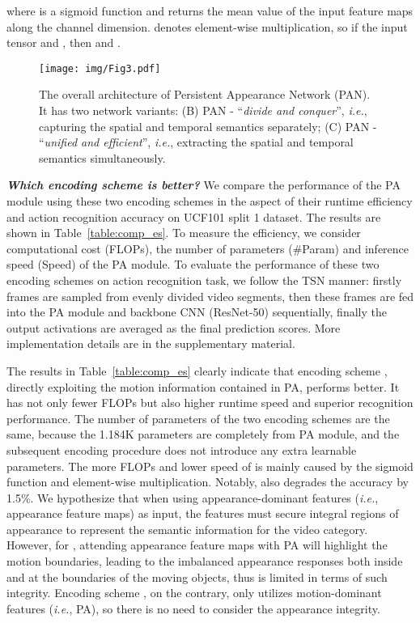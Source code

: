 \documentclass[journal]{IEEEtran}
\begin{document}
\noindent where  is a sigmoid function and  returns the mean value of the input feature maps along the channel dimension.  denotes element-wise multiplication, so if the input tensor  and , then  and .





\begin{figure*}[!htbp]
\begin{center}
\texttt{[image: img/Fig3.pdf]}
\end{center}
   \caption{The overall architecture of Persistent Appearance Network (PAN). It has two network variants: (B) PAN - ``\emph{divide and conquer}'', \emph{i.e.}, capturing the spatial and temporal semantics separately; (C) PAN - ``\emph{unified and efficient}'', \emph{i.e.}, extracting the spatial and temporal semantics simultaneously.}
\label{fig:PAN}
\end{figure*}

\textbf{\emph{Which encoding scheme is better? }} We compare the performance of the PA module using these two encoding schemes in the aspect of their runtime efficiency and action recognition accuracy on UCF101 split 1 dataset. The results are shown in Table~\ref{table:comp_es}. To measure the efficiency, we consider computational cost (FLOPs), the number of parameters (\#Param) and inference speed (Speed) of the PA module. To evaluate the performance of these two encoding schemes on action recognition task, we follow the TSN manner: firstly frames are sampled from evenly divided video segments, then these frames are fed into the PA module and backbone CNN (ResNet-50) sequentially, finally the output activations are averaged as the final prediction scores. More implementation details are in the supplementary material.

The results in Table~\ref{table:comp_es} clearly indicate that encoding scheme , directly exploiting the motion information contained in PA, performs better. It has not only fewer FLOPs but also higher runtime speed and superior recognition performance. The number of parameters of the two encoding schemes are the same, because the 1.184K parameters are completely from PA module, and the subsequent encoding procedure does not introduce any extra learnable parameters. The more FLOPs and lower speed of  is mainly caused by the sigmoid function and element-wise multiplication. Notably,  also degrades the accuracy by 1.5\%. We hypothesize that when using appearance-dominant features (\emph{i.e.}, appearance feature maps) as input, the features must secure integral regions of appearance to represent the semantic information for the video category. However, for , attending appearance feature maps with PA will highlight the motion boundaries, leading to the imbalanced appearance responses both inside and at the boundaries of the moving objects, thus  is limited in terms of such integrity. Encoding scheme , on the contrary, only utilizes motion-dominant features (\emph{i.e.}, PA), so there is no need to consider the appearance integrity. 
\end{document}
